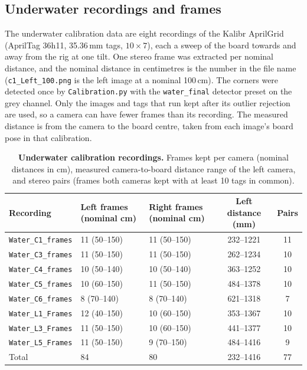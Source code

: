 \subsection*{Underwater recordings and frames}
\label{app:heldout:recordings}

The underwater calibration data are eight recordings of the Kalibr AprilGrid (AprilTag 36h11, 35.36\,mm tags,
$10\times7$), each a sweep of the board towards and away from the rig at one tilt. One stereo frame was extracted
per nominal distance, and the nominal distance in centimetres is the number in the file name
(\texttt{c1\_Left\_100.png} is the left image at a nominal 100\,cm). The corners were detected once by
\texttt{Calibration.py} with the \texttt{water\_final} detector preset on the grey channel. Only the images and
tags that run kept after its outlier rejection are used, so a camera can have fewer frames than its recording.
The measured distance is from the camera to the board centre, taken from each image's board pose in that
calibration.

\begin{table}[H]
\centering
\caption[Underwater calibration recordings]{\textbf{Underwater calibration recordings.} Frames kept per camera
(nominal distances in cm), measured camera-to-board distance range of the left camera, and stereo pairs (frames
both cameras kept with at least 10 tags in common).}
\label{tab:app:recordings}
\small
\begin{tabular}{lllcc}
\toprule
Recording & Left frames (nominal cm) & Right frames (nominal cm) & Left distance (mm) & Pairs \\
\midrule
\texttt{Water\_C1\_frames} & 11 (50--150)          & 11 (50--150)          & 232--1221 & 11 \\
\texttt{Water\_C3\_frames} & 11 (50--150)          & 11 (50--150)          & 262--1234 & 10 \\
\texttt{Water\_C4\_frames} & 10 (50--140)          & 10 (50--140)          & 363--1252 & 10 \\
\texttt{Water\_C5\_frames} & 10 (60--150)          & 11 (50--150)          & 484--1378 & 10 \\
\texttt{Water\_C6\_frames} &  8 (70--140)          &  8 (70--140)          & 621--1318 &  7 \\
\texttt{Water\_L1\_Frames} & 12 (40--150)          & 10 (60--150)          & 353--1367 & 10 \\
\texttt{Water\_L3\_Frames} & 11 (50--150)          & 10 (60--150)          & 441--1377 & 10 \\
\texttt{Water\_L5\_Frames} & 11 (50--150)          &  9 (70--150)          & 484--1416 &  9 \\
\midrule
Total                      & 84                    & 80                    & 232--1416 & 77 \\
\bottomrule
\end{tabular}
\end{table}

